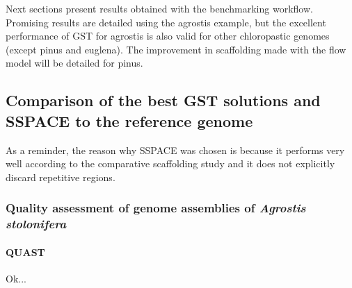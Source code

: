 \documentclass[12pt]{article}
\begin{document}
Next sections present results obtained with the benchmarking workflow. Promising results are detailed using the agrostis example, but the excellent performance of GST for agrostis is also valid for other chloropastic genomes (except pinus and euglena). The improvement in scaffolding made with the flow model will be detailed for pinus.

\newpage
\subsection{Comparison of the best GST solutions and SSPACE to the reference genome}
As a reminder, the reason why SSPACE was chosen is because it performs very well according to the comparative scaffolding study \cite{u} and it does not explicitly discard repetitive regions.
\subsubsection{Quality assessment of genome assemblies of \textit{Agrostis stolonifera}}

\paragraph*{QUAST} 
Ok...
\end{document}
